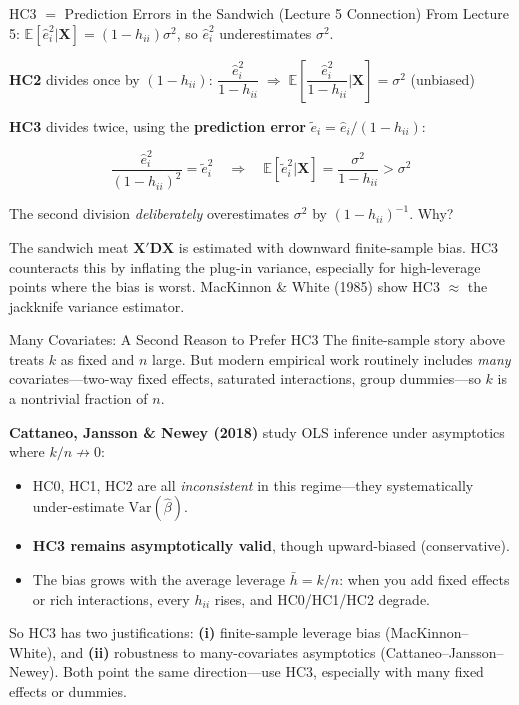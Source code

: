 \documentclass[aspectratio=169, handout, t]{beamer}
\numberwithin{equation}{section}
\begin{document}
\begin{frame}{HC3 $=$ Prediction Errors in the Sandwich (Lecture 5 Connection)}
\small
From Lecture 5: $\mathbb{E}[\hat{e}_i^2|\bm{X}]=(1-h_{ii})\sigma^2$, so $\hat{e}_i^2$ underestimates $\sigma^2$.

\smallskip
\textbf{HC2} divides once by $(1-h_{ii})$:\quad
$\dfrac{\hat{e}_i^2}{1-h_{ii}} \;\Longrightarrow\; \mathbb{E}\!\left[\dfrac{\hat{e}_i^2}{1-h_{ii}}\bigg|\bm{X}\right]=\sigma^2$ \quad (unbiased)\pause

\smallskip
\textbf{HC3} divides twice, using the \textbf{prediction error} $\tilde{e}_i=\hat{e}_i/(1-h_{ii})$:

\vspace{-4pt}
$$\frac{\hat{e}_i^2}{(1-h_{ii})^2}=\tilde{e}_i^2 \quad\Longrightarrow\quad \mathbb{E}\!\left[\tilde{e}_i^2\big|\bm{X}\right]=\frac{\sigma^2}{1-h_{ii}}>\sigma^2$$

\vspace{-6pt}\pause
The second division \emph{deliberately} overestimates $\sigma^2$ by $(1-h_{ii})^{-1}$.  Why?\pause

\vspace{-2pt}
\begin{tcolorbox}[colback=blue!5, colframe=blue!50]
The sandwich meat $\bm{X'DX}$ is estimated with downward finite-sample bias.  HC3 counteracts this by inflating the plug-in variance, especially for high-leverage points where the bias is worst.  MacKinnon \& White (1985) show HC3 $\approx$ the jackknife variance estimator.
\end{tcolorbox}
\end{frame}

\begin{frame}{Many Covariates: A Second Reason to Prefer HC3}
\small
The finite-sample story above treats $k$ as fixed and $n$ large.  But modern empirical work routinely includes \emph{many} covariates---two-way fixed effects, saturated interactions, group dummies---so $k$ is a nontrivial fraction of $n$.\pause

\smallskip
\textbf{Cattaneo, Jansson \& Newey (2018)} study OLS inference under asymptotics where $k/n \not\to 0$:
\begin{itemize}
\item \alert{HC0, HC1, HC2 are all \emph{inconsistent}} in this regime---they systematically under-estimate $\text{Var}(\hat{\beta})$.\pause
\item \textbf{HC3 remains asymptotically valid}, though upward-biased (conservative).\pause
\item The bias grows with the average leverage $\bar{h}=k/n$: when you add fixed effects or rich interactions, every $h_{ii}$ rises, and HC0/HC1/HC2 degrade.
\end{itemize}\pause

\begin{tcolorbox}[colback=blue!5, colframe=blue!50]
So HC3 has two justifications: \textbf{(i)} finite-sample leverage bias (MacKinnon--White), and \textbf{(ii)} robustness to many-covariates asymptotics (Cattaneo--Jansson--Newey).  Both point the same direction---use HC3, especially with many fixed effects or dummies.
\end{tcolorbox}
\end{frame}
\end{document}
